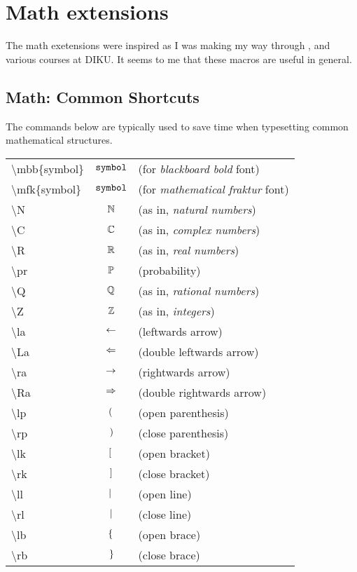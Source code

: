 \section{Math extensions}

\def\commandstyle{{\ttfamily\textbackslash}}
\def\command#1{\texttt{\textbackslash #1}}

The math exetensions were inspired as I was making my way through
\cite{concrete-mathematics}, and various courses at DIKU. It seems to me that
these macros are useful in general.

\subsection{Math: Common Shortcuts}

The commands below are typically used to save time when typesetting common mathematical structures.

\vspace{0.1in}

\noindent
\begin{tabular}{lcl}

\textbackslash mbb\{symbol\} & $\mathbb{\mathtt{symbol}}$ & (for \emph{blackboard bold} font) \\
\textbackslash mfk\{symbol\} & $\mathfrak{\mathtt{symbol}}$ & (for \emph{mathematical fraktur} font) \\
\textbackslash N & $\mathbb{N}$ & (as in, \emph{natural numbers}) \\
\textbackslash C & $\mathbb{C}$ & (as in, \emph{complex numbers}) \\
\textbackslash R & $\mathbb{R}$ & (as in, \emph{real numbers}) \\
\textbackslash pr & $\mathbb{P}$ & (probability) \\
\textbackslash Q & $\mathbb{Q}$ & (as in, \emph{rational numbers}) \\
\textbackslash Z & $\mathbb{Z}$ & (as in, \emph{integers}) \\
\textbackslash la & $\leftarrow$ & (leftwards arrow) \\
\textbackslash La & $\Leftarrow$ & (double leftwards arrow) \\
\textbackslash ra & $\rightarrow$ & (rightwards arrow) \\
\textbackslash Ra & $\Rightarrow$ & (double rightwards arrow) \\
\textbackslash lp & $\lp\r.$ & (open parenthesis) \\
\textbackslash rp & $\l.\rp$ & (close parenthesis) \\
\textbackslash lk & $\lk\r.$ & (open bracket) \\
\textbackslash rk & $\l.\rk$ & (close bracket) \\
\textbackslash ll & $\ll\r.$ & (open line) \\
\textbackslash rl & $\l.\rl$ & (close line) \\
\textbackslash lb & $\lb\r.$ & (open brace) \\
\textbackslash rb & $\l.\rb$ & (close brace) \\

\end{tabular}

